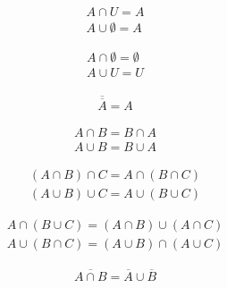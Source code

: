 \documentclass[12pt, openany, oneside]{book}
\begin{document}
\begin{tcolorbox}
	\begin{align}
		A \cap U = A \\
		A \cup \emptyset = A
	\end{align}
\end{tcolorbox}

\begin{tcolorbox}
	\begin{align}
		A \cap \emptyset = \emptyset \\
		A \cup U = U
	\end{align}
\end{tcolorbox}

\begin{tcolorbox}
	\begin{align}
		\overline {\overline A} = A
	\end{align}
\end{tcolorbox}

\begin{tcolorbox}
	\begin{align}
		A \cap B = B \cap A \\
		A \cup B = B \cup A
	\end{align}
\end{tcolorbox}

\begin{tcolorbox}
	\begin{align}
		(A \cap B) \cap C = A \cap (B \cap C) \\
		(A \cup B) \cup C = A \cup (B \cup C)
	\end{align}
\end{tcolorbox}

\begin{tcolorbox}
	\begin{align}
		A \cap (B \cup C) = (A \cap B) \cup (A \cap C) \\
		A \cup (B \cap C) = (A \cup B) \cap (A \cup C)
	\end{align}
\end{tcolorbox}

\begin{tcolorbox}
	\begin{align}
		\overline{A \cap B} = \overline A \cup \overline B
	\end{align}
\end{tcolorbox}
\end{document}
